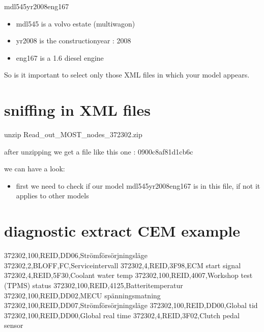 \documentclass[letterpaper,10pt,english]{sphinxmanual}
\begin{document}
\sphinxAtStartPar
mdl545yr2008eng167
\begin{itemize}
\item {} 
\sphinxAtStartPar
mdl545 is a volvo estate (multiwagon)

\item {} 
\sphinxAtStartPar
yr2008 is the constructionyear : 2008

\item {} 
\sphinxAtStartPar
eng167 is a 1.6 diesel engine

\end{itemize}

\sphinxAtStartPar
So is it important to select only those XML files in which your model appears.


\section{sniffing in XML files}
\label{\detokenize{decoding:sniffing-in-xml-files}}
\sphinxAtStartPar
unzip Read\_out\_MOST\_nodes\_372302.zip

\sphinxAtStartPar
{}

\sphinxAtStartPar
after unzipping we get a file like this one : 0900c8af81d1cb6c

\sphinxAtStartPar
we can have a look:
\begin{itemize}
\item {} 
\sphinxAtStartPar
first we need to check if our model mdl545yr2008eng167 is in this file, if not it applies to other models

\end{itemize}


\section{diagnostic extract CEM example}
\label{\detokenize{decoding:diagnostic-extract-cem-example}}
\begin{sphinxVerbatim}[commandchars=\\\{\}]
372302,100,REID,DD06,Strömförsörjningsläge
372302,2,BLOFF,FC,Serviceintervall
372302,4,REID,3F98,ECM start signal
372302,4,REID,5F30,Coolant water temp
372302,100,REID,4007,Workshop test (TPMS) status
372302,100,REID,4125,Batteritemperatur
372302,100,REID,DD02,MECU spänningsmatning
372302,100,REID,DD07,Strömförsörjningsläge
372302,100,REID,DD00,Global tid
372302,100,REID,DD00,Global real time
372302,4,REID,3F02,Clutch pedal sensor
\end{sphinxVerbatim}
\end{document}
